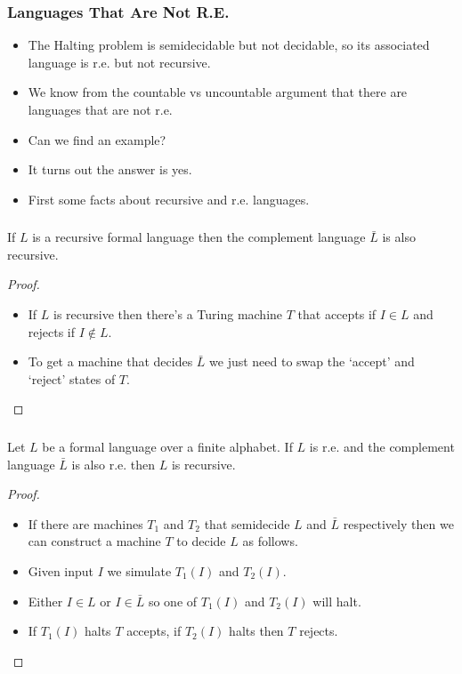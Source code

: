 \documentclass[handout]{beamer}
\begin{document}
\begin{frame}
\frametitle{Languages That Are Not R.E.}
\begin{itemize}
\item The Halting problem is semidecidable but not decidable, so its associated language is r.e. but not recursive.
\vspace{0.4cm}
\item We know from the countable vs uncountable argument that there are languages that are not r.e.
\vspace{0.4cm}
\item Can we find an example?
\vspace{0.4cm}
\item It turns out the answer is yes.
\vspace{0.4cm}
\item First some facts about recursive and r.e. languages.
\end{itemize}
\end{frame}

\begin{frame}
\frametitle{}
\begin{theorem}\label{T:rec}
If $L$ is a recursive formal language then the complement language $\bar{L}$ is also recursive.
\end{theorem}
\begin{proof}
\begin{itemize}
\item If $L$ is recursive then there's a Turing machine $T$ that accepts if $I\in L$ and rejects if $I\notin L$. 
\item To get a machine that decides $\bar{L}$ we just need to swap the `accept' and `reject' states of $T$.
\end{itemize}
\end{proof}
\end{frame}

\begin{frame}
\frametitle{}
\begin{theorem}\label{T:comps}
Let $L$ be a formal language over a finite alphabet. If $L$ is r.e. and the complement language $\bar{L}$ is also r.e. then $L$ is recursive.
\end{theorem}
\begin{proof}
\begin{itemize}
\item  If there are machines $T_1$ and $T_2$ that semidecide $L$ and $\bar{L}$ respectively then we can construct a machine $T$ to decide $L$ as follows. 
\item Given input $I$ we simulate $T_1(I)$ and $T_2(I)$. 
\item Either $I\in L$ or $I\in \bar{L}$ so one of $T_1(I)$ and $T_2(I)$ will halt. 
\item If $T_1(I)$ halts $T$ accepts, if $T_2(I)$ halts then $T$ rejects. 
\end{itemize} 
\end{proof}
\end{frame}
\end{document}
